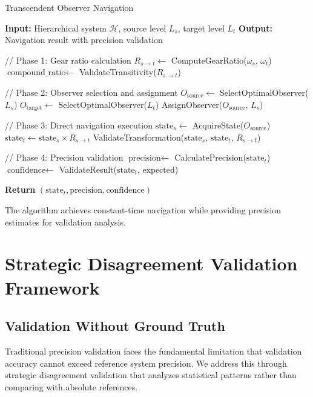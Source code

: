 \documentclass[12pt,a4paper]{article}
\begin{document}
\begin{algorithm}
\caption{Transcendent Observer Navigation}
\begin{algorithmic}
\State \textbf{Input:} Hierarchical system $\mathcal{H}$, source level $L_s$, target level $L_t$
\State \textbf{Output:} Navigation result with precision validation

\State // Phase 1: Gear ratio calculation
\State $R_{s \to t} \leftarrow$ ComputeGearRatio($\omega_s$, $\omega_t$)
\State $\text{compound\_ratio} \leftarrow$ ValidateTransitivity($R_{s \to t}$)

\State // Phase 2: Observer selection and assignment
\State $O_{\text{source}} \leftarrow$ SelectOptimalObserver($L_s$)
\State $O_{\text{target}} \leftarrow$ SelectOptimalObserver($L_t$)
\State AssignObserver($O_{\text{source}}$, $L_s$)

\State // Phase 3: Direct navigation execution
\State $\text{state}_s \leftarrow$ AcquireState($O_{\text{source}}$)
\State $\text{state}_t \leftarrow \text{state}_s \times R_{s \to t}$
\State ValidateTransformation($\text{state}_s$, $\text{state}_t$, $R_{s \to t}$)

\State // Phase 4: Precision validation
\State $\text{precision} \leftarrow$ CalculatePrecision($\text{state}_t$)
\State $\text{confidence} \leftarrow$ ValidateResult($\text{state}_t$, $\text{expected}$)

\State \textbf{Return} $(\text{state}_t, \text{precision}, \text{confidence})$
\end{algorithmic}
\end{algorithm}

The algorithm achieves constant-time navigation while providing precision estimates for validation analysis.

\section{Strategic Disagreement Validation Framework}

\subsection{Validation Without Ground Truth}

Traditional precision validation faces the fundamental limitation that validation accuracy cannot exceed reference system precision. We address this through strategic disagreement validation that analyzes statistical patterns rather than comparing with absolute references.
\end{document}
